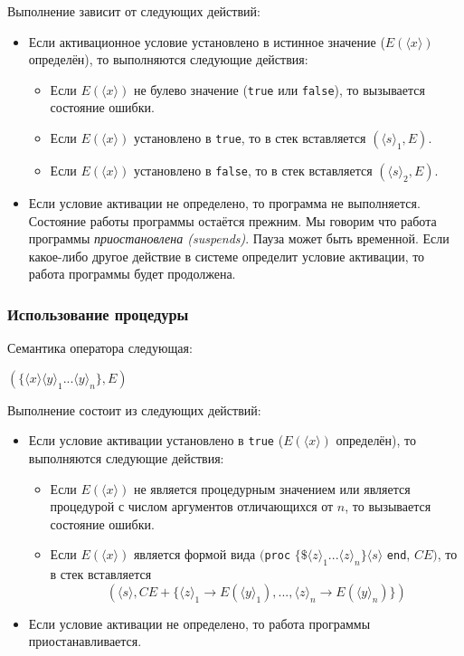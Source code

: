 Выполнение зависит от следующих действий:

\begin{itemize}
\item{Если активационное условие установлено в истинное значение ($E(\langle x \rangle)$ определён), то выполняются следующие действия:

  \begin{itemize}
\item{Если $E(\langle x \rangle)$ не булево значение (\lstinline|true| или \lstinline|false|), то вызывается состояние ошибки.}

\item{Если $E(\langle x \rangle)$ установлено в \lstinline|true|, то в стек вставляется $({\langle s \rangle}_{1}, E)$.}

\item{Если $E(\langle x \rangle)$ установлено в \lstinline|false|, то в стек вставляется $({\langle s \rangle}_{2}, E)$.}
  \end{itemize}
}

\item{Если условие активации не определено, то программа не выполняется. Состояние работы программы остаётся прежним. Мы говорим что работа программы \emph{приостановлена (suspends)}. Пауза может быть временной. Если какое-либо другое действие в системе определит условие активации, то работа программы будет продолжена.}
\end{itemize}

\subsubsection{Использование процедуры}

Семантика оператора следующая:

$(\{ \langle x \rangle {\langle y \rangle}_{1} ... {\langle y \rangle}_{n}\},E)$

Выполнение состоит из следующих действий:

\begin{itemize}
\item{Если условие активации установлено в \lstinline|true| ($E(\langle x \rangle)$ определён), то выполняются следующие действия:

  \begin{itemize}
  \item{Если $E(\langle x \rangle)$ не является процедурным значением или является процедурой с числом аргументов отличающихся от $n$, то вызывается состояние ошибки.}

  \item{Если $E(\langle x \rangle)$ является формой вида $($\lstinline|proc| $\{ \$ {\langle z \rangle}_{1} ... {\langle z \rangle}_{n}\} {\langle s \rangle}$ \lstinline|end|, $CE)$, то в стек вставляется
    $$(\langle s \rangle, CE + \{ {\langle z \rangle}_{1} \to E({\langle y \rangle}_{1}), ..., {\langle z \rangle}_{n} \to E({\langle y \rangle}_{n})\})$$}
\end{itemize}
}

\item{Если условие активации не определено, то работа программы приостанавливается.}
\end{itemize}

